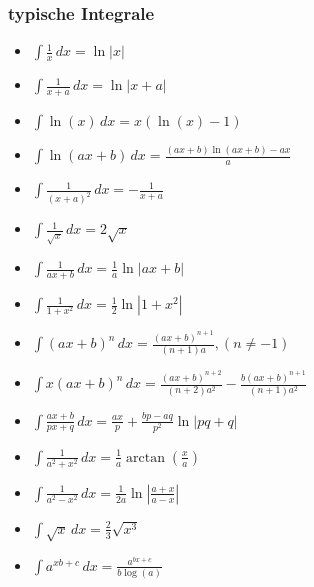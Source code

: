 \subsubsection{typische Integrale}
\begin{itemize}[leftmargin=*]
  	\item $\int \frac{1}{x} \,dx = \ln |x|$
  	\item $\int \frac{1}{x+a} \,dx = \ln |x+a|$
  	\item $\int \ln(x) \,dx = x(\ln(x) - 1)$
  	\item $\int \ln(ax + b) \,dx = \frac{(a x+b) \ln (a x+b)-a x}{a}$
  	\item $\int \frac{1}{(x+a)^2} \,dx = - \frac{1}{x+a}$
  	\item $\int \frac{1}{\sqrt{x}} \,dx = 2 \sqrt{x}$
	\item $\int \frac{1}{ax+b} \,dx = \frac{1}{a} \ln |ax+b|$
	\item $\int \frac{1}{1 + x^2} \,dx = \frac{1}{2} \ln |1 + x^2|$
	\item $\int(ax + b)^n \,dx = \frac{(ax + b)^{n+1}}{(n + 1)a}, (n \neq -1)$
	\item $\int x(ax+b)^n \,dx = \frac{(ax + b)^{n+2}}{(n+2)a^2} -
	\frac{b(ax+b)^{n+1}}{(n+1)a^2}$
	\item $\int \frac{ax + b}{px + q} \,dx = \frac{ax}{p} + \frac{bp - aq}{p^2} \ln
	|pq+q|$
	\item $\int \frac{1}{a^2 + x^2} \,dx = \frac{1}{a} \arctan(\frac{x}{a})$
	\item $\int \frac{1}{a^2 - x^2} \,dx = \frac{1}{2a} \ln \left | \frac{a+x}{a-x}
	\right |$
	\item $\int \sqrt{x} \,dx = \frac{2}{3}\sqrt{x^3}$
	\item $\int a^{xb + c} \,dx = \frac{a^{bx + c}}{b \log(a)}$
\end{itemize}

